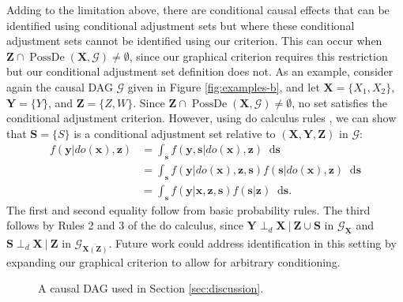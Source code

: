 \documentclass[twoside]{article}
\DeclareMathOperator{\PossDe}{PossDe}
\newcommand\given[1][]{\:#1\vert\:}
\newcommand{\mb}[1]{\mathbf{#1}}
\newcommand{\dsepp}{\perp_{d}}
\newcommand{\g}[1][G]{\mathcal{#1}}
\newcommand*\diff{\mathop{}\!\mathrm{d}}
\begin{document}
Adding to the limitation above, there are conditional causal effects that can be identified using conditional adjustment sets but where these conditional adjustment sets cannot be identified using our criterion. This can occur when $\mb{Z} \cap \PossDe(\mb{X},\g) \neq \emptyset$, since our graphical criterion requires this restriction but our conditional adjustment set definition does not. As an example, consider again the causal DAG $\g$ given in Figure \ref{fig:examples-b}, and let $\mb{X} =\{X_1,X_2\}$, $\mb{Y}=\{Y\}$, and $\mb{Z}=\{Z, W\}$. Since $\mb{Z} \cap \PossDe(\mb{X},\g) \neq \emptyset$, no set satisfies the conditional adjustment criterion. However, using do calculus rules \citep{pearl2009causality}, we can show that $\mb{S}=\{S\}$ is a conditional adjustment set relative to $(\mb{X,Y,Z})$ in $\g$:
\begin{align}
    f(\mb{y}|do(\mb{x}),\mb{z}) 
            &= \int_\mb{s} f(\mb{y},\mb{s}|do(\mb{x}),\mb{z}) \diff \mb{s} \nonumber \\
            &= \int_\mb{s} f(\mb{y}|do(\mb{x}),\mb{z},\mb{s}) f(\mb{s}|do(\mb{x}),\mb{z}) \diff \mb{s} \nonumber \\
            &= \int_\mb{s} f(\mb{y}|\mb{x},\mb{z},\mb{s}) f(\mb{s}|\mb{z}) \diff \mb{s}. \nonumber
\end{align}
The first and second equality follow from basic probability rules. The third follows by Rules 2 and 3 of the do calculus, since $\mb{Y} \dsepp \mb{X} \given \mb{Z} \cup \mb{S}$ in $\g_{\underline{\mb{X}}}$ and $\mb{S} \dsepp \mb{X} \given \mb{Z}$ in $\g_{\overline{\mb{X}(\mb{Z})}}$. Future work could address identification in this setting by expanding our graphical criterion to allow for arbitrary conditioning.


\begin{figure}
    \centering
    \caption{A causal DAG used in Section \ref{sec:discussion}.}
    \label{fig:discussion}
\end{figure}
\end{document}
